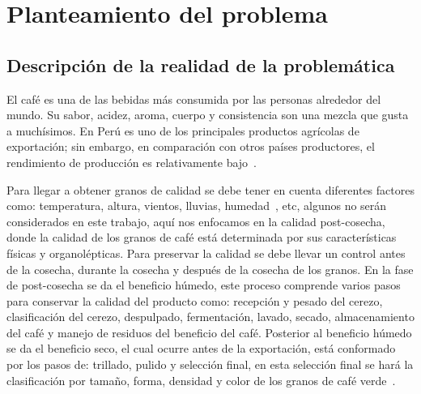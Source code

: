 \documentclass[12pt,a4paper,oneside]{book}
\begin{document}
\newpage
\newpage



\tableofcontents
\cleardoublepage
\makegloss
\newpage




\chapter{Planteamiento del problema}
\section{Descripción de la realidad de la problemática}
El café es una de las bebidas más consumida por las personas alrededor del mundo. Su sabor, acidez, aroma, cuerpo y consistencia son una mezcla que gusta a muchísimos. En Perú es uno de los principales productos agrícolas de exportación; sin embargo, en comparación con otros países productores, el rendimiento de producción es relativamente bajo~\cite{Diaz2017}.

Para llegar a obtener granos de calidad se debe tener en cuenta diferentes factores como: temperatura, altura, vientos, lluvias, humedad~\cite{Figueroa2015}, etc, algunos no serán considerados en este trabajo, aquí nos enfocamos en la calidad post-cosecha, donde la calidad de los granos de café está determinada por sus características físicas y organolépticas. Para preservar la calidad se debe llevar un control antes de la cosecha, durante la cosecha y después de la cosecha de los granos. En la fase de post-cosecha se da el beneficio húmedo, este proceso comprende varios pasos para conservar la calidad del producto como: recepción y pesado del cerezo, clasificación del cerezo, despulpado, fermentación, lavado, secado, almacenamiento del café y manejo de residuos del beneficio del café. Posterior al beneficio húmedo se da el beneficio seco, el cual ocurre antes de la exportación, está conformado por los pasos de: trillado, pulido y selección final, en esta selección final se hará la clasificación por tamaño, forma, densidad y color de los granos de café verde~\cite{Marin2013}.
\end{document}
